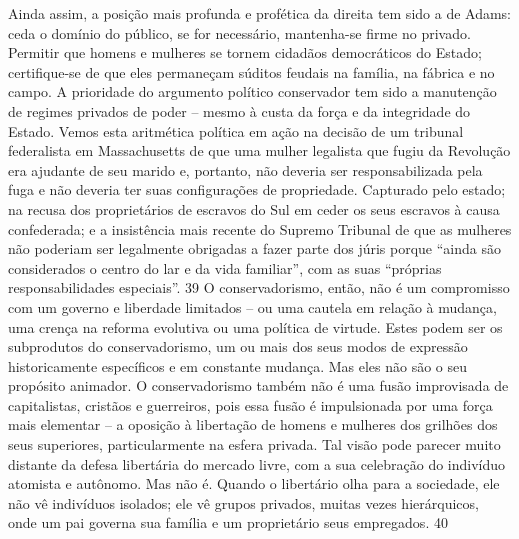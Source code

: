 Ainda assim, a posição mais profunda e profética da direita tem sido a de Adams: ceda o domínio do público, se for necessário, mantenha-se firme no privado. Permitir que homens e mulheres se tornem cidadãos democráticos do Estado; certifique-se de que eles permaneçam súditos feudais na família, na fábrica e no campo. A prioridade do argumento político conservador tem sido a manutenção de regimes privados de poder – mesmo à custa da força e da integridade do Estado. Vemos esta aritmética política em ação na decisão de um tribunal federalista em Massachusetts de que uma mulher legalista que fugiu da Revolução era ajudante de seu marido e, portanto, não deveria ser responsabilizada pela fuga e não deveria ter suas configurações de propriedade. Capturado pelo estado; na recusa dos proprietários de escravos do Sul em ceder os seus escravos à causa confederada; e a insistência mais recente do Supremo Tribunal de que as mulheres não poderiam ser legalmente obrigadas a fazer parte dos júris porque “ainda são considerados o centro do lar e da vida familiar”, com as suas “próprias responsabilidades especiais”.
 {\color{blue} 39}  
O conservadorismo, então, não é um compromisso com um governo e liberdade limitados – ou uma cautela em relação à mudança, uma crença na reforma evolutiva ou uma política de virtude. Estes podem ser os subprodutos do conservadorismo, um ou mais dos seus modos de expressão historicamente específicos e em constante mudança. Mas eles não são o seu propósito animador. O conservadorismo também não é uma fusão improvisada de capitalistas, cristãos e guerreiros, pois essa fusão é impulsionada por uma força mais elementar – a oposição à libertação de homens e mulheres dos grilhões dos seus superiores, particularmente na esfera privada. Tal visão pode parecer muito distante da defesa libertária do mercado livre, com a sua celebração do indivíduo atomista e autônomo. Mas não é. Quando o libertário olha para a sociedade, ele não vê indivíduos isolados; ele vê grupos privados, muitas vezes hierárquicos, onde um pai governa sua família e um proprietário seus empregados.
 {\color{blue} 40}  

 
\par
 
